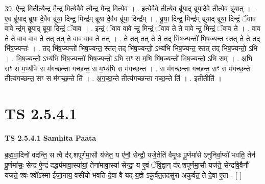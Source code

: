 \documentclass[17pt]{extarticle}
\begin{document}
39. ऐ॒न्द्र मितीत्यै॒न्द्र मै॒न्द्र मित्ये॒वैवे त्यै॒न्द्र मै॒न्द्र मित्ये॒व । . इत्ये॒वैवे तीत्ये॒व ब्रू॑याद् ब्रूयादे॒वे तीत्ये॒व ब्रू॑यात् । . ए॒व ब्रू॑याद् ब्रूया दे॒वैव ब्रू॑या॒ दिन्द्र॒ मिन्द्र॑म् ब्रूया दे॒वैव ब्रू॑या॒ दिन्द्र᳚म् । . ब्रू॒या॒ दिन्द्र॒ मिन्द्र॑म् ब्रूयाद् ब्रूया॒ दिन्द्रं॒ ॅवाव वावे न्द्र॑म् ब्रूयाद् ब्रूया॒ दिन्द्रं॒ ॅवाव । . इन्द्रं॒ ॅवाव वावे न्द्र॒ मिन्द्रं॒ ॅवाव ते ते वावे न्द्र॒ मिन्द्रं॒ ॅवाव ते । . वाव ते ते वाव वाव ते तत् तत् ते वाव वाव ते तत् । . ते तत् तत् ते ते तद् भि॑ष॒ज्यन्तो॑ भिष॒ज्यन्त॒ स्तत् ते ते तद् भि॑ष॒ज्यन्तः॑ । . तद् भि॑ष॒ज्यन्तो॑ भिष॒ज्यन्त॒ स्तत् तद् भि॑ष॒ज्यन्तो॒ ऽभ्य॑भि भि॑ष॒ज्यन्त॒ स्तत् तद् भि॑ष॒ज्यन्तो॒ ऽभि । . भि॒ष॒ज्यन्तो॒ ऽभ्य॑भि भि॑ष॒ज्यन्तो॑ भिष॒ज्यन्तो॒ ऽभि सꣳ स म॒भि भि॑ष॒ज्यन्तो॑ भिष॒ज्यन्तो॒ ऽभि सम् । . अ॒भि सꣳ स म॒भ्य॑भि स म॑गच्छन्ता गच्छन्त॒ स म॒भ्य॑भि स म॑गच्छन्त । . स म॑गच्छन्ता गच्छन्त॒ सꣳ स म॑गच्छ॒न्ते तीत्य॑गच्छन्त॒ सꣳ स म॑गच्छ॒न्ते ति॑ । . अ॒ग॒च्छ॒न्ते तीत्य॑गच्छन्ता गच्छ॒न्ते ति॑ । . इतीतीति॑ । \newline
\pagebreak
{}
\section*{ TS 2.5.4.1 }

\textbf{TS 2.5.4.1 } \newline
\textbf{Samhita Paata} \newline

ब्र॒ह्म॒वा॒दिनो॑ वदन्ति॒ स त्वै द॑॑र्.शपूर्णमा॒सौ य॑जेत॒ य ए॑नौ॒ सेन्द्रौ॒ यजे॒तेति॑ वैमृ॒धः पू॒र्णमा॑से ऽनुनिर्वा॒प्यो॑ भवति॒ तेन॑ पू॒र्णमा॑सः॒ सेन्द्र॑ ऐ॒न्द्रं दद्ध्य॑मावा॒स्या॑यां॒ तेना॑मावा॒स्या॑ सेन्द्रा॒ य ए॒वं ॅवि॒द्वान् द॑र्.शपूर्णमा॒सौ यज॑ते॒ सेन्द्रा॑वे॒वैनौ॑ यजते॒ श्वः श्वो᳚ऽस्मा ईजा॒नाय॒ वसी॑यो भवति दे॒वा वै यद्-य॒ज्ञे ऽकु॑र्वत॒तदसु॑रा अकुर्वत॒ ते दे॒वा ए॒ता - [  ] \newline
\end{document}
